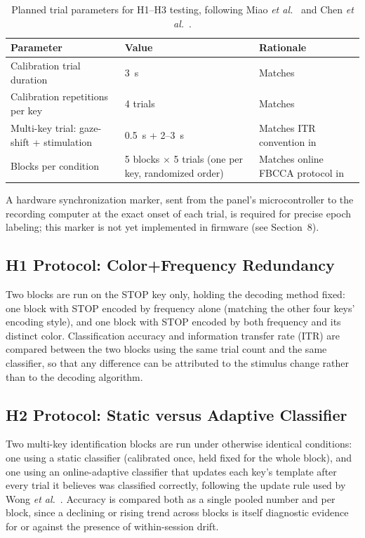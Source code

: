 \documentclass[11pt]{article}
\begin{document}
\begin{table}[htbp]
\centering
\caption{Planned trial parameters for H1--H3 testing, following Miao \textit{et al.}~\cite{miao2024cvepminimal} and Chen \textit{et al.}~\cite{chen2015pnas}.}
\label{tab:trial-params}
\small
\begin{tabular}{@{}p{6.2cm} p{2.5cm} p{4.6cm}@{}}
\toprule
\textbf{Parameter} & \textbf{Value} & \textbf{Rationale} \\
\midrule
Calibration trial duration & 3~s & Matches~\cite{miao2024cvepminimal} \\
Calibration repetitions per key & 4 trials & Matches~\cite{miao2024cvepminimal} \\
Multi-key trial: gaze-shift + stimulation & 0.5~s + 2--3~s & Matches ITR convention in~\cite{chen2015pnas} \\
Blocks per condition & 5 blocks $\times$ 5 trials (one per key, randomized order) & Matches online FBCCA protocol in~\cite{chen2015fbcca} \\
\bottomrule
\end{tabular}
\end{table}

A hardware synchronization marker, sent from the panel's microcontroller to the recording computer at the exact onset of each trial, is required for precise epoch labeling; this marker is not yet implemented in firmware (see Section~8).

\subsection{H1 Protocol: Color+Frequency Redundancy}

Two blocks are run on the STOP key only, holding the decoding method fixed: one block with STOP encoded by frequency alone (matching the other four keys' encoding style), and one block with STOP encoded by both frequency and its distinct color. Classification accuracy and information transfer rate (ITR) are compared between the two blocks using the same trial count and the same classifier, so that any difference can be attributed to the stimulus change rather than to the decoding algorithm.

\subsection{H2 Protocol: Static versus Adaptive Classifier}

Two multi-key identification blocks are run under otherwise identical conditions: one using a static classifier (calibrated once, held fixed for the whole block), and one using an online-adaptive classifier that updates each key's template after every trial it believes was classified correctly, following the update rule used by Wong \textit{et al.}~\cite{wong2022onlineadaptation}. Accuracy is compared both as a single pooled number and per block, since a declining or rising trend across blocks is itself diagnostic evidence for or against the presence of within-session drift.
\end{document}
